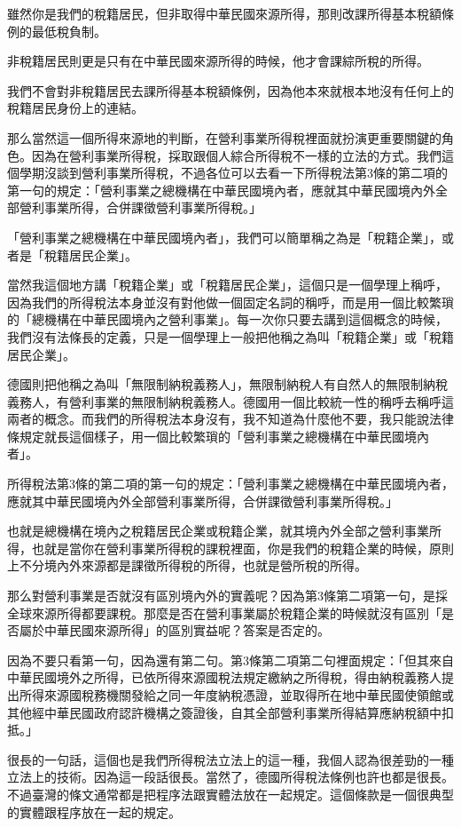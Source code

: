 \documentclass[oneside,sub3section]{ctexbook}
\begin{document}
雖然你是我們的稅籍居民，但非取得中華民國來源所得，那則改課所得基本稅額條例的最低稅負制。

非稅籍居民則更是只有在中華民國來源所得的時候，他才會課綜所稅的所得。

我們不會對非稅籍居民去課所得基本稅額條例，因為他本來就根本地沒有任何上的稅籍居民身份上的連結。

那么當然這一個所得來源地的判斷，在營利事業所得稅裡面就扮演更重要關鍵的角色。因為在營利事業所得稅，採取跟個人綜合所得稅不一樣的立法的方式。我們這個學期沒談到營利事業所得稅，不過各位可以去看一下所得稅法第3條的第二項的第一句的規定：「營利事業之總機構在中華民國境內者，應就其中華民國境內外全部營利事業所得，合併課徵營利事業所得稅。」

「營利事業之總機構在中華民國境內者」，我們可以簡單稱之為是「稅籍企業」，或者是「稅籍居民企業」。

當然我這個地方講「稅籍企業」或「稅籍居民企業」，這個只是一個學理上稱呼，因為我們的所得稅法本身並沒有對他做一個固定名詞的稱呼，而是用一個比較繁瑣的「總機構在中華民國境內之營利事業」。每一次你只要去講到這個概念的時候，我們沒有法條長的定義，只是一個學理上一般把他稱之為叫「稅籍企業」或「稅籍居民企業」。

德國則把他稱之為叫「無限制納稅義務人」，無限制納稅人有自然人的無限制納稅義務人，有營利事業的無限制納稅義務人。德國用一個比較統一性的稱呼去稱呼這兩者的概念。而我們的所得稅法本身沒有，我不知道為什麼他不要，我只能說法律條規定就長這個樣子，用一個比較繁瑣的「營利事業之總機構在中華民國境內者」。

所得稅法第3條的第二項的第一句的規定：「營利事業之總機構在中華民國境內者，應就其中華民國境內外全部營利事業所得，合併課徵營利事業所得稅。」

也就是總機構在境內之稅籍居民企業或稅籍企業，就其境內外全部之營利事業所得，也就是當你在營利事業所得稅的課稅裡面，你是我們的稅籍企業的時候，原則上不分境內外來源都是課徵所得稅的所得，也就是營所稅的所得。

那么對營利事業是否就沒有區別境內外的實義呢？因為第3條第二項第一句，是採全球來源所得都要課稅。那麼是否在營利事業屬於稅籍企業的時候就沒有區別「是否屬於中華民國來源所得」的區別實益呢？答案是否定的。

因為不要只看第一句，因為還有第二句。第3條第二項第二句裡面規定：「但其來自中華民國境外之所得，已依所得來源國稅法規定繳納之所得稅，得由納稅義務人提出所得來源國稅務機關發給之同一年度納稅憑證，並取得所在地中華民國使領館或其他經中華民國政府認許機構之簽證後，自其全部營利事業所得結算應納稅額中扣抵。」

很長的一句話，這個也是我們所得稅法立法上的這一種，我個人認為很差勁的一種立法上的技術。因為這一段話很長。當然了，德國所得稅法條例也許也都是很長。不過臺灣的條文通常都是把程序法跟實體法放在一起規定。這個條款是一個很典型的實體跟程序放在一起的規定。
\end{document}
